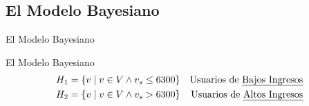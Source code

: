\documentclass{beamer}
\begin{document}
\subsection{El Modelo Bayesiano}

\begin{frame}{El Modelo Bayesiano}
	
\end{frame}

\begin{frame}{El Modelo Bayesiano}
	\begin{align*}
		H_1 &= \left\{ v \mid v \in V \wedge v_s \leq 6300 \right\} &\text{Usuarios de \emph{Bajos Ingresos}} \\
		H_2 &= \left\{ v \mid v \in V \wedge v_s >    6300 \right\} &\text{Usuarios de \emph{Altos Ingresos}}
	\end{align*}
\end{frame}
\end{document}
